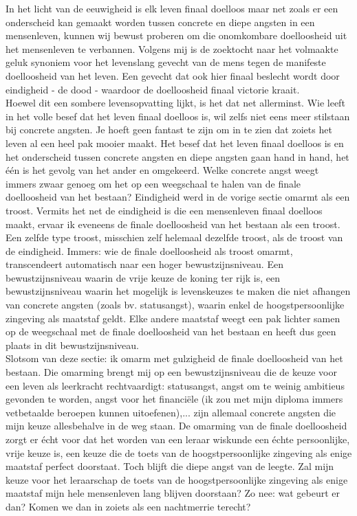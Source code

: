 \documentclass[a4paper,11pt]{article}
\theoremstyle{definition}
\begin{document}
 In het licht van de  eeuwigheid is elk leven finaal doelloos maar net zoals er een onderscheid kan gemaakt
 worden tussen concrete en diepe angsten in een mensenleven, kunnen wij bewust proberen om die 
 onomkombare doelloosheid uit het mensenleven te verbannen. Volgens mij is de zoektocht naar het volmaakte geluk synoniem voor het 
levenslang gevecht van de mens tegen de manifeste doelloosheid van het leven. 
Een gevecht dat ook hier finaal beslecht wordt door eindigheid - de dood - waardoor de doelloosheid finaal victorie kraait. \\

Hoewel dit een sombere levensopvatting lijkt, is het dat net allerminst. Wie 
leeft in het volle besef dat het leven finaal doelloos is, wil zelfs niet eens 
meer stilstaan bij concrete angsten. Je hoeft geen fantast te zijn om in te zien dat zoiets het leven al een heel pak mooier maakt.
Het besef dat het leven finaal doelloos is en het onderscheid tussen concrete angsten en diepe angsten
gaan hand in hand, het één is het gevolg van het ander en omgekeerd. Welke concrete angst weegt immers zwaar genoeg 
om het op een weegschaal te halen van de finale doelloosheid van het bestaan?  Eindigheid werd in de vorige sectie omarmt als een troost. Vermits 
het net de eindigheid is die een mensenleven finaal doelloos maakt, ervaar ik 
eveneens de finale doelloosheid van het bestaan als een troost. Een zelfde type 
troost, misschien zelf helemaal dezelfde troost, als de troost van de 
eindigheid. Immers: wie de finale doelloosheid als troost omarmt, transcendeert 
automatisch naar een hoger bewustzijnsniveau. Een bewustzijnsniveau waarin de 
vrije keuze de koning ter rijk is, een bewustzijnsniveau waarin het mogelijk is 
levenskeuzes te maken die niet afhangen van concrete angsten (zoals bv. statusangst), waarin enkel de 
hoogstpersoonlijke zingeving als maatstaf geldt. Elke andere maatstaf weegt een 
pak lichter samen op de weegschaal met de finale doelloosheid van het bestaan en 
heeft dus geen plaats in dit bewustzijnsniveau.\\

Slotsom van deze sectie: ik omarm met gulzigheid de finale doelloosheid van het 
bestaan. Die omarming brengt mij op een bewustzijnsniveau die de keuze voor een 
leven als leerkracht rechtvaardigt: statusangst, angst om te weinig ambitieus 
gevonden te worden, angst voor het financiële (ik zou met mijn diploma immers vetbetaalde beroepen kunnen 
uitoefenen),... zijn allemaal concrete angsten die mijn keuze allesbehalve in de 
weg staan. De omarming van de finale doelloosheid zorgt er écht voor dat het 
worden van een leraar wiskunde een échte persoonlijke, vrije keuze is, een keuze die de 
toets van de hoogstpersoonlijke zingeving als enige maatstaf perfect doorstaat. 
Toch blijft die diepe angst van de leegte. Zal mijn keuze voor het leraarschap de 
toets van de hoogstpersoonlijke zingeving als enige maatstaf mijn hele 
mensenleven lang blijven doorstaan? Zo nee: wat gebeurt er dan? Komen we dan in 
zoiets als een nachtmerrie terecht?
\end{document}
